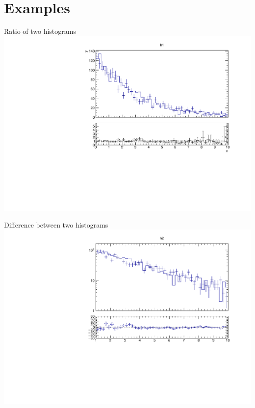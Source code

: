\documentclass{beamer}
\begin{document}
\section{Examples}

\begin{frame}{\insertsection}
  \centering
  Ratio of two histograms
  \includegraphics[width=0.9\linewidth]{assets/tut1.pdf} 
\end{frame}

\begin{frame}{\insertsection}
  \centering
  Difference between two histograms
  \includegraphics[width=0.9\linewidth]{assets/diff.pdf} 
\end{frame}
\end{document}
